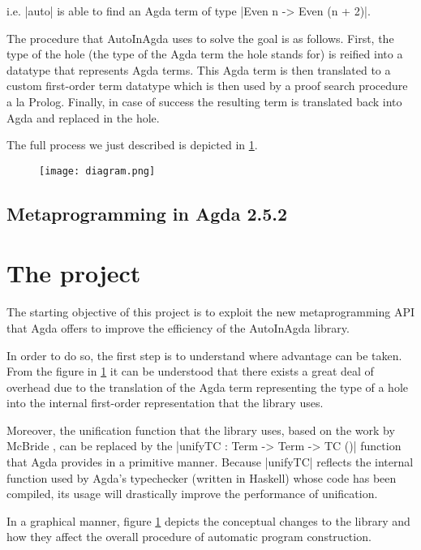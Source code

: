 \documentclass[12pt]{article}
\begin{document}
\noindent
i.e. |auto| is able to find an Agda term of type |Even n -> Even (n + 2)|.

The procedure that AutoInAgda uses to solve the goal is as follows. First,
the type of the hole (the type of the Agda term the hole stands for) is reified
into a datatype that represents Agda terms. This Agda term is then translated to
a custom first-order term datatype which is then used by a proof search
procedure a la Prolog. Finally, in case of success the resulting term is
translated back into Agda and replaced in the hole.

The full process we just described is depicted in \ref{fig:diagram}.

\begin{figure}[h]
  \label{fig:diagram}
  \texttt{[image: diagram.png]}
\end{figure}

\subsection{Metaprogramming in Agda 2.5.2}
\label{subsec:metaprogramming}

\todo{}

\section{The project}
\label{sec:thisproject}

The starting objective of this project is to exploit the new metaprogramming API
that Agda offers to improve the efficiency of the AutoInAgda library.

In order to do so, the first step is to understand where advantage can be taken.
From the figure in \ref{fig:diagram} it can be understood that there exists a great
deal of overhead due to the translation of the Agda term representing the type
of a hole into the internal first-order representation that the library uses.

Moreover, the unification function that the library uses, based on the work by
McBride \cite{McBride:2003:FUS:967499.967502}, can be replaced by the |unifyTC :
Term -> Term -> TC ()| function that Agda provides in a primitive manner.
Because |unifyTC| reflects the internal function used by Agda's typechecker
(written in Haskell) whose code has been compiled, its usage will drastically
improve the performance of unification.

In a graphical manner, figure \ref{fig:diagram} depicts the conceptual changes
to the library and how they affect the overall procedure of automatic program
construction.
\end{document}
